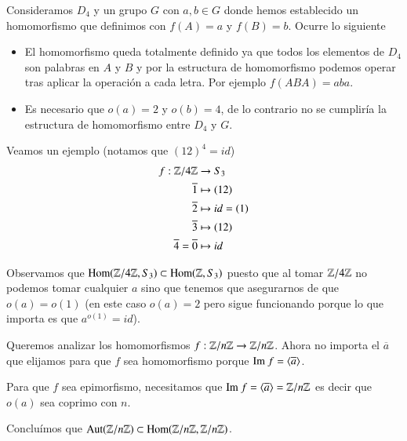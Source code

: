 \begin{ej}
	Consideramos $D_4$ y un grupo $G$ con $a,b \in G$ donde hemos establecido un homomorfismo que definimos con $f(A) = a$ y $f(B) = b$. Ocurre lo siguiente
	\begin{itemize}
		\item El homomorfismo queda totalmente definido ya que todos los elementos de $D_4$ son palabras en $A$ y $B$ y por la estructura de homomorfismo podemos operar tras aplicar la operación a cada letra. Por ejemplo $f(ABA) = aba$.
		\item Es necesario que $o(a) = 2$ y $o(b) = 4$, de lo contrario no se cumpliría la estructura de homomorfismo entre $D_4$ y $G$.
	\end{itemize}
\end{ej}



\begin{ej}
	Veamos un ejemplo (notamos que $(12)^4 = id$)
	\begin{align*}
	f:\mathbb{Z}/4\mathbb{Z} &\to S_3 \\
	\overline{1} &\mapsto (12) \\
	\overline{2} &\mapsto id = (1) \\
	\overline{3} &\mapsto (12) \\
	\overline{4} = \overline{0} &\mapsto id
	\end{align*}
	
	Observamos que $\text{Hom}(\mathbb{Z}/4\mathbb{Z}, S_3) \subset \text{Hom}(\mathbb{Z}, S_3)$ puesto que al tomar $\mathbb{Z}/4\mathbb{Z}$ no podemos tomar cualquier $a$ sino que tenemos que asegurarnos de que $o(a) = o(1)$ (en este caso $o(a) = 2$ pero sigue funcionando porque lo que importa es que $a^{o(1)} = id$).
\end{ej}

Queremos analizar los homomorfismos $f:\mathbb{Z}/n\mathbb{Z} \to \mathbb{Z}/n\mathbb{Z}$. Ahora no importa el $\overline{a}$ que elijamos para que $f$ sea homomorfismo porque $\text{Im } f = \langle \overline{a} \rangle$. 

Para que $f$ sea epimorfismo, necesitamos que $\text{Im } f = \langle \overline{a} \rangle = \mathbb{Z}/n\mathbb{Z}$ es decir que $o(a)$ sea coprimo con $n$.

Concluímos que $\text{Aut}(\mathbb{Z}/n\mathbb{Z}) \subset \text{Hom}(\mathbb{Z}/n\mathbb{Z}, \mathbb{Z}/n\mathbb{Z})$.

